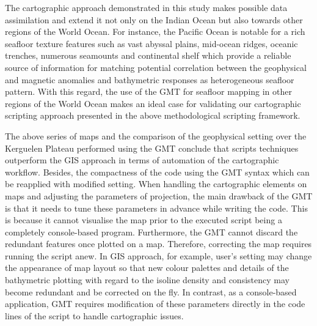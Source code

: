 \documentclass[geomatics,article,submit,pdftex,moreauthors]{Definitions/mdpi}
\begin{document}
The cartographic approach demonstrated in this study makes possible data assimilation and extend it not only on the Indian Ocean but also towards other regions of the World Ocean. For instance, the Pacific Ocean is notable for a rich seafloor texture features such as vast abyssal plains, mid-ocean ridges, oceanic trenches, numerous seamounts and continental shelf which provide a reliable source of information for matching potential correlation between the geophysical and magnetic anomalies and bathymetric responses as heterogeneous seafloor pattern. With this regard, the use of the GMT for seafloor mapping in other regions of the World Ocean makes an ideal case for validating our cartographic scripting approach presented in the above methodological scripting framework. 

The above series of maps and the comparison of the geophysical setting over the Kerguelen Plateau performed using the GMT conclude that scripts techniques outperform the GIS approach in terms of automation of the cartographic workflow. Besides, the compactness of the code using the GMT syntax which can be reapplied with modified setting. When handling the cartographic elements on maps and adjusting the parameters of projection, the main drawback of the GMT is that it needs to tune these parameters in advance while writing the code. This is because it cannot visualise the map prior to the executed script being a completely console-based program. Furthermore, the GMT cannot discard the redundant features once plotted on a map. Therefore, correcting the map requires running the script anew. In GIS approach, for example, user's setting may change the appearance of map layout so that new colour palettes and details of the bathymetric plotting with regard to the isoline density and consistency may become redundant and be corrected on the fly. In contrast, as a console-based application, GMT requires modification of these parameters directly in the code lines of the script to handle cartographic issues. 





\end{document}
